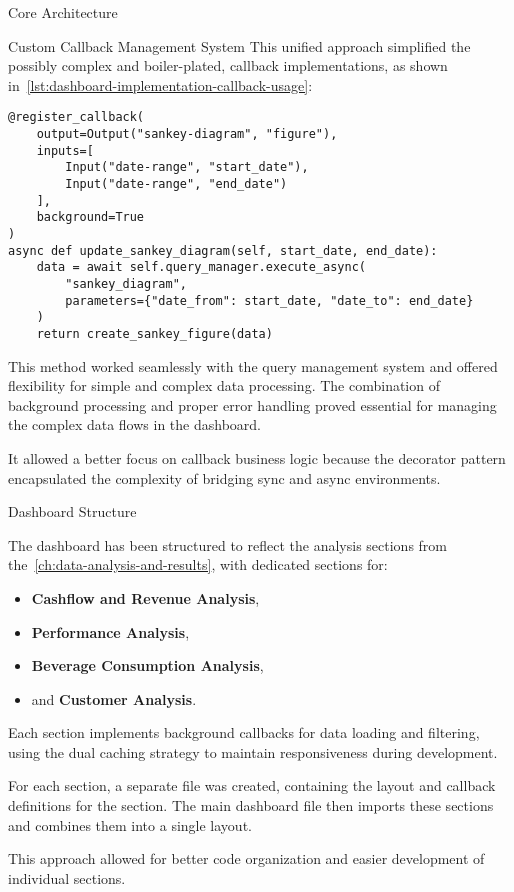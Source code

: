 \begin{section}{Core Architecture}
\begin{subsection}{Custom Callback Management System}
		This unified approach simplified the possibly complex and boiler-plated, callback implementations, as shown in~\autoref{lst:dashboard-implementation-callback-usage}:

		\begin{listing}[H]
			\caption{Callback Registration Example}
			\begin{verbatim}
@register_callback(
    output=Output("sankey-diagram", "figure"),
    inputs=[
        Input("date-range", "start_date"),
        Input("date-range", "end_date")
    ],
    background=True
)
async def update_sankey_diagram(self, start_date, end_date):
    data = await self.query_manager.execute_async(
        "sankey_diagram",
        parameters={"date_from": start_date, "date_to": end_date}
    )
    return create_sankey_figure(data)
			\end{verbatim}
			\label{lst:dashboard-implementation-callback-usage}
		\end{listing}

		This method worked seamlessly with the query management system and offered flexibility for simple and complex data processing.
		The combination of background processing and proper error handling proved essential for managing the complex data flows in the dashboard.

		It allowed a better focus on callback business logic because the decorator pattern encapsulated the complexity of bridging sync and async environments.
	\end{subsection}

	\begin{subsection}{Dashboard Structure}
		\label{subsec:implementation-core-architecture-structure}

		The dashboard has been structured to reflect the analysis sections from the~\autoref{ch:data-analysis-and-results}, with dedicated sections for:
		\begin{itemize}
			\item \textbf{Cashflow and Revenue Analysis},
			\item \textbf{Performance Analysis},
			\item \textbf{Beverage Consumption Analysis},
			\item and \textbf{Customer Analysis}.
		\end{itemize}

		Each section implements background callbacks for data loading and filtering, using the dual caching strategy to maintain responsiveness during development.

		For each section, a separate file was created, containing the layout and callback definitions for the section.
		The main dashboard file then imports these sections and combines them into a single layout.

		This approach allowed for better code organization and easier development of individual sections.
	\end{subsection}
\end{section}

